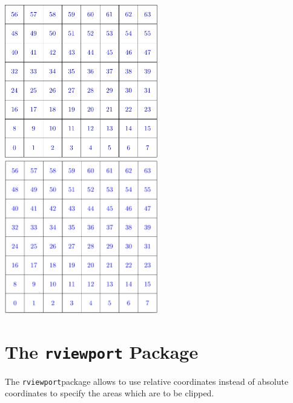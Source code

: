 \documentclass[a4paper,11pt]{article}
\newcommand\code[1]{\texttt{#1}}
\begin{document}
\noindent\includegraphics[width=0.5\textwidth,clip=true,trim=1cm 1cm 1cm 1cm]{images/grid8cm.pdf}
\includegraphics[width=0.5\textwidth,clip=true,trim=1cm 1cm 1cm 1cm]{images/grid8cm.png}


\newpage
\section{The \code{rviewport} Package}
\label{sec:rviewport}

The \code{rviewport}\footnotemark  package allows to use  relative coordinates
instead of absolute coordinates to specify the areas which are to be clipped.

\end{document}
